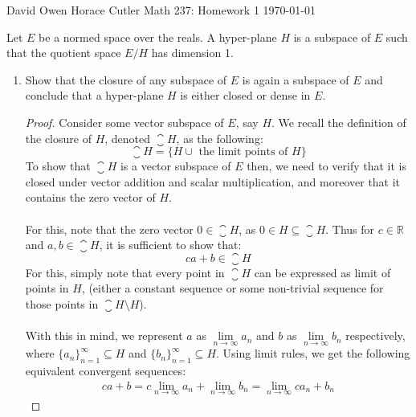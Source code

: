 \documentclass[12pt]{article}
\newenvironment{ex}[2][Exercise]{\begin{trivlist}
\item[\hskip \labelsep {\bfseries #1}\hskip \labelsep {\bfseries #2.}]}{\end{trivlist}}
\begin{document}
\noindent David Owen Horace Cutler \hfill {\Large Math 237: Homework 1} \hfill \today

\begin{ex}{2}
    Let $E$ be a normed space over the reals. A hyper-plane $H$ is a subspace of $E$ such that the quotient space $E/H$ has dimension 1.
    \begin{enumerate}[label=(\alph*)]
        \item Show that the closure of any subspace of $E$ is again a subspace of $E$ and conclude that a hyper-plane $H$ is either closed or dense in $E$.
        \begin{proof}
            Consider some vector subspace of $E$, say $H$. We recall the definition of the closure of $H$, denoted $\closure{H}$, as the following:
            \begin{equation}
                \closure{H} = \{H \cup \text{ the limit points of } H\}
            \end{equation}
            To show that $\closure{H}$ is a vector subspace of $E$ then, we need to verify that it is closed under vector addition and scalar multiplication, and moreover that it contains the zero vector of $H$. \\ \\
            For this, note that the zero vector $0 \in \closure{H}$, as $0 \in H \subseteq \closure{H}$. Thus for $c \in \mathbb{R}$ and $a, b \in \closure{H}$, it is sufficient to show that:
            \begin{equation}
                ca + b \in \closure{H}
            \end{equation}
            For this, simply note that every point in $\closure{H}$ can be expressed as limit of points in $H$, (either a constant sequence or some non-trivial sequence for those points in $\closure{H} \setminus H$). \\ \\
            With this in mind, we represent $a$ as $\underset{n \rightarrow \infty}{\lim} a_n$ and $b$ as $\underset{n \rightarrow \infty}{\lim} b_n$ respectively, where $\{a_n\}_{n = 1}^\infty \subseteq H$ and $\{b_n\}_{n = 1}^\infty \subseteq H$. Using limit rules, we get the following equivalent convergent sequences:
            \begin{equation}
                \begin{aligned}
                    ca + b = c\underset{n \rightarrow \infty}{\lim} a_n + \underset{n \rightarrow \infty}{\lim} b_n = \underset{n \rightarrow \infty}{\lim} ca_n + b_n

\end{aligned}
\end{equation}
\end{proof}
\end{enumerate}
\end{ex}
\end{document}
